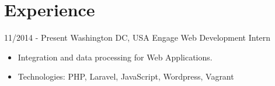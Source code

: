 \documentclass{markusos-cv}
\begin{document}

\section{Experience}

\begin{entrylist}
\entry
{11/2014 - Present}
{Washington DC, USA}
{Engage}
{Web Development Intern} 
{
\begin{itemize}
\item Integration and data processing for Web Applications.
\item Technologies: PHP, Laravel, JavaScript, Wordpress, Vagrant 
\end{itemize}
}
\\%


\end{entrylist}
\end{document}

